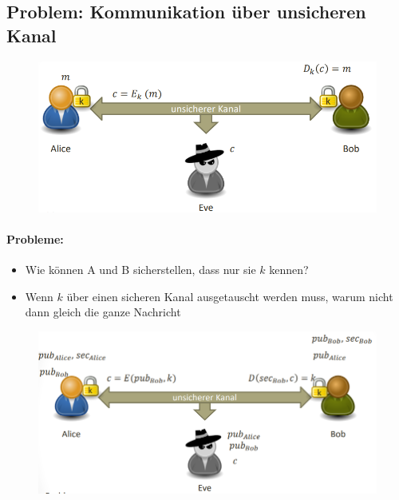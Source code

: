 \subsection{Problem: Kommunikation über unsicheren Kanal}
\begin{figure}[H]
	\begin{center}
		\includegraphics[scale=0.8]{Resources/DH1}
		\caption{}
		\label{fig:DH1}
	\end{center}
\end{figure}
\paragraph{Probleme:}
\begin{itemize}
	\item Wie können A und B sicherstellen, dass nur sie $k$ kennen?
	\item Wenn $k$ über einen sicheren Kanal ausgetauscht werden muss, warum nicht dann gleich die ganze Nachricht 
\end{itemize}

\begin{figure}[H]
	\begin{center}
		\includegraphics[scale=0.5]{Resources/DH2}
		\caption{}
		\label{fig:DH2}
	\end{center}
\end{figure}

